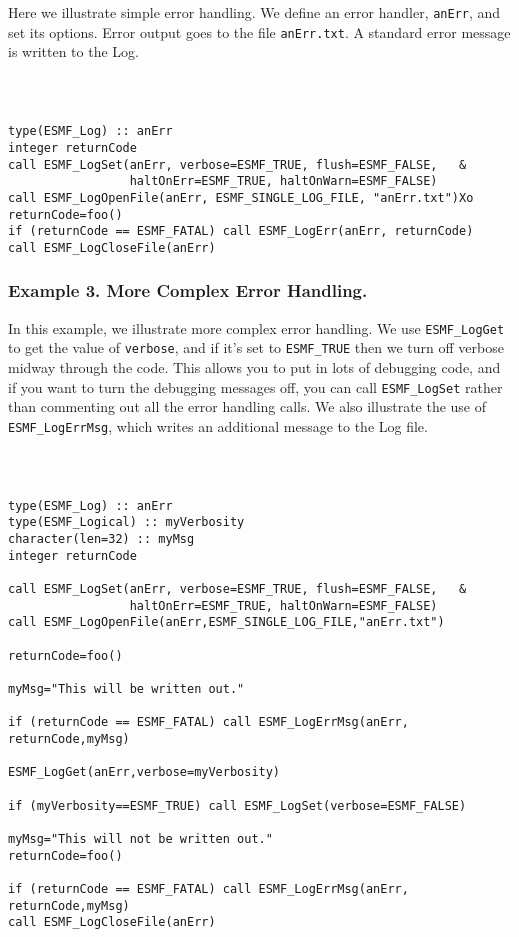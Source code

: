 Here we illustrate simple error handling.  We define an error handler, 
{\tt anErr}, and set its options.  Error output goes to the file 
{\tt anErr.txt}.  A standard error message is written to the Log.  

{\tt
\begin{verbatim}

type(ESMF_Log) :: anErr
integer returnCode 
call ESMF_LogSet(anErr, verbose=ESMF_TRUE, flush=ESMF_FALSE,   &
                 haltOnErr=ESMF_TRUE, haltOnWarn=ESMF_FALSE)
call ESMF_LogOpenFile(anErr, ESMF_SINGLE_LOG_FILE, "anErr.txt")Xo
returnCode=foo()
if (returnCode == ESMF_FATAL) call ESMF_LogErr(anErr, returnCode) 
call ESMF_LogCloseFile(anErr)
\end{verbatim}
\tt}

\subsubsection{Example 3. More Complex Error Handling.}

In this example, we illustrate more complex error handling.  We use
{\tt ESMF\_LogGet} to get the value of {\tt verbose}, and if it's set to 
{\tt ESMF\_TRUE} then we turn off verbose midway through the code.  This allows 
you to put in lots of debugging code, and if you want to turn the debugging
messages off, you can call {\tt ESMF\_LogSet} rather than commenting out all 
the error handling calls.  We also illustrate the use of {\tt ESMF\_LogErrMsg},
which writes an additional message to the Log file.

{\tt
\begin{verbatim}

type(ESMF_Log) :: anErr
type(ESMF_Logical) :: myVerbosity
character(len=32) :: myMsg
integer returnCode 

call ESMF_LogSet(anErr, verbose=ESMF_TRUE, flush=ESMF_FALSE,   &
                 haltOnErr=ESMF_TRUE, haltOnWarn=ESMF_FALSE)
call ESMF_LogOpenFile(anErr,ESMF_SINGLE_LOG_FILE,"anErr.txt")

returnCode=foo()

myMsg="This will be written out."

if (returnCode == ESMF_FATAL) call ESMF_LogErrMsg(anErr, returnCode,myMsg) 

ESMF_LogGet(anErr,verbose=myVerbosity)

if (myVerbosity==ESMF_TRUE) call ESMF_LogSet(verbose=ESMF_FALSE)

myMsg="This will not be written out."
returnCode=foo()

if (returnCode == ESMF_FATAL) call ESMF_LogErrMsg(anErr, returnCode,myMsg)
call ESMF_LogCloseFile(anErr)

\end{verbatim}
\tt}




